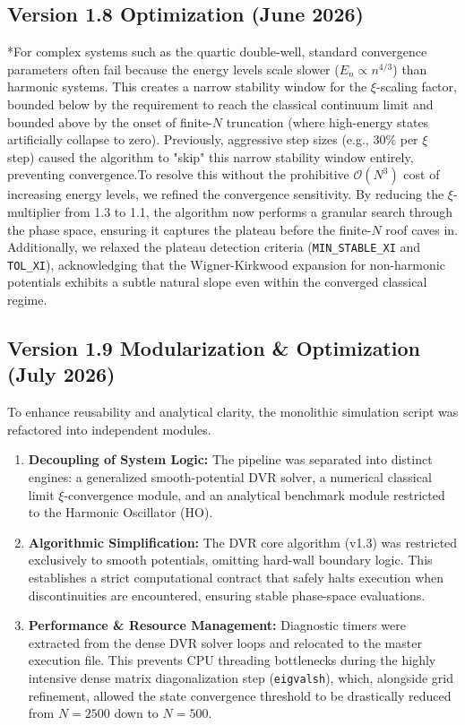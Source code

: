 \documentclass{article}
\numberwithin{equation}{subsection}
\begin{document}
\subsection*{Version 1.8 Optimization (June 2026)}*For complex systems such as the quartic double-well, standard convergence parameters often fail because the energy levels scale slower ($E_n \propto n^{4/3}$) than harmonic systems. This creates a narrow stability window for the $\xi$-scaling factor, bounded below by the requirement to reach the classical continuum limit and bounded above by the onset of finite-$N$ truncation (where high-energy states artificially collapse to zero). Previously, aggressive step sizes (e.g., 30\% per $\xi$ step) caused the algorithm to "skip" this narrow stability window entirely, preventing convergence.To resolve this without the prohibitive $\mathcal{O}(N^3)$ cost of increasing energy levels, we refined the convergence sensitivity. By reducing the $\xi$-multiplier from 1.3 to 1.1, the algorithm now performs a granular search through the phase space, ensuring it captures the plateau before the finite-$N$ roof caves in. Additionally, we relaxed the plateau detection criteria (\texttt{MIN\_STABLE\_XI} and \texttt{TOL\_XI}), acknowledging that the Wigner-Kirkwood expansion for non-harmonic potentials exhibits a subtle natural slope even within the converged classical regime.

\subsection*{Version 1.9 Modularization \& Optimization (July 2026)}
To enhance reusability and analytical clarity, the monolithic simulation script was refactored into independent modules.

\begin{enumerate}[label=\textbf{\arabic*.}]
    \item \textbf{Decoupling of System Logic:} The pipeline was separated into distinct engines: a generalized smooth-potential DVR solver, a numerical classical limit $\xi$-convergence module, and an analytical benchmark module restricted to the Harmonic Oscillator (HO).
    \item \textbf{Algorithmic Simplification:} The DVR core algorithm (v1.3) was restricted exclusively to smooth potentials, omitting hard-wall boundary logic. This establishes a strict computational contract that safely halts execution when discontinuities are encountered, ensuring stable phase-space evaluations.
    \item \textbf{Performance \& Resource Management:} Diagnostic timers were extracted from the dense DVR solver loops and relocated to the master execution file. This prevents CPU threading bottlenecks during the highly intensive dense matrix diagonalization step (\texttt{eigvalsh}), which, alongside grid refinement, allowed the state convergence threshold to be drastically reduced from $N=2500$ down to $N=500$.
\end{enumerate}
\end{document}
